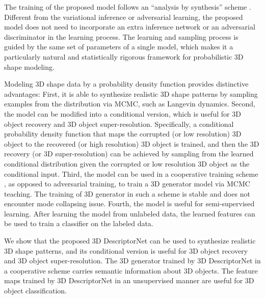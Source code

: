 \documentclass[10pt,twocolumn,letterpaper]{article}
\begin{document}
The training of the proposed model follows an ``analysis by synthesis'' scheme \cite{grenander2007pattern}. Different from the variational inference or adversarial learning, the proposed model does not need to incorporate an extra inference network or an adversarial discriminator in the learning process.  The learning and sampling process is guided by the same set of parameters of a single model, which makes it a particularly natural and statistically rigorous framework for probabilistic 3D shape modeling. 

Modeling 3D shape data by a probability density function provides distinctive advantages: First, it is able to synthesize realistic 3D shape patterns by sampling examples from the distribution via MCMC, such as Langevin dynamics. Second, the model can be modified into a conditional version, which is useful for 3D object recovery and 3D object super-resolution. Specifically, a conditional probability density function that maps the corrupted (or low resolution) 3D object to the recovered (or high resolution) 3D object is trained, and then the 3D recovery (or 3D super-resolution) can be achieved by sampling from the learned conditional distribution given the corrupted or low resolution 3D object as the conditional input. Third, the model can be used in a cooperative training scheme \cite{xie2016cooperative}, as opposed to adversarial training, to train a 3D generator model via MCMC teaching. The training of 3D generator in such a scheme is stable and does not encounter mode collapsing issue. Fourth, the model is useful for semi-supervised learning. After learning the model from unlabeled data, the learned features can be used to train a classifier on the labeled data. 

We show that the proposed 3D DescriptorNet can be used to synthesize realistic 3D shape patterns, and its conditional version is useful for 3D object recovery and 3D object super-resolution. The 3D generator trained by 3D DescriptorNet in a cooperative scheme carries semantic information about 3D objects. The feature maps trained by 3D DescriptorNet in an unsupervised manner are useful for 3D object classification.   
\end{document}
